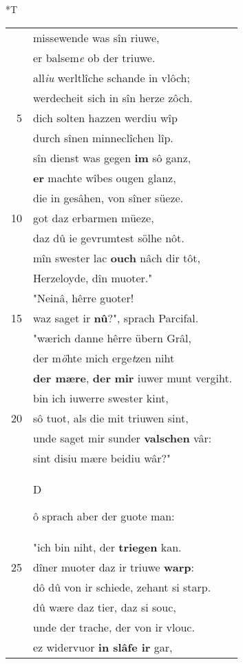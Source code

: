 \documentclass[8pt,a4paper,notitlepage]{article}
\begin{document}
\begin{table}[ht]
\begin{minipage}[t]{0.5\linewidth}
\small
\begin{center}*T
\end{center}
\begin{tabular}{rl}
 & missewende was sîn riuwe,\\ 
 & er balsem\textit{e} ob der triuwe.\\ 
 & all\textit{iu} werltlîche schande in vlôch;\\ 
 & werdecheit sich in sîn herze zôch.\\ 
5 & dich solten hazzen werdiu wîp\\ 
 & durch sînen minneclîchen lîp.\\ 
 & sîn dienst was gegen \textbf{im} sô ganz,\\ 
 & \textbf{er} machte wîbes ougen glanz,\\ 
 & die in gesâhen, von sîner süeze.\\ 
10 & got daz erbarmen müeze,\\ 
 & daz dû ie gevrumtest sölhe nôt.\\ 
 & mîn swester lac \textbf{ouch} nâch dir tôt,\\ 
 & Herzeloyde, dîn muoter."\\ 
 & "Neinâ, hêrre guoter!\\ 
15 & waz saget ir \textbf{nû}?", sprach Parcifal.\\ 
 & "wærich danne hêrre übern Grâl,\\ 
 & der m\textit{ö}hte mich erge\textit{t}zen niht\\ 
 & \textbf{der mære}, \textbf{der} \textbf{mir} iuwer munt vergiht.\\ 
 & bin ich iuwerre swester kint,\\ 
20 & sô tuot, als die mit triuwen sint,\\ 
 & unde saget mir sunder \textbf{valschen} vâr:\\ 
 & sint disiu mære beidiu wâr?"\\ 
 & \begin{large}D\end{large}ô sprach aber der guote man:\\ 
 & "ich bin niht, der \textbf{triegen} kan.\\ 
25 & dîner muoter daz ir triuwe \textbf{warp}:\\ 
 & dô dû von ir schiede, zehant si starp.\\ 
 & dû wære daz tier, daz si souc,\\ 
 & unde der trache, der von ir vlouc.\\ 
 & ez widervuor \textbf{in slâfe ir} gar,\\ 

\end{tabular}
\end{minipage}
\end{table}
\end{document}
